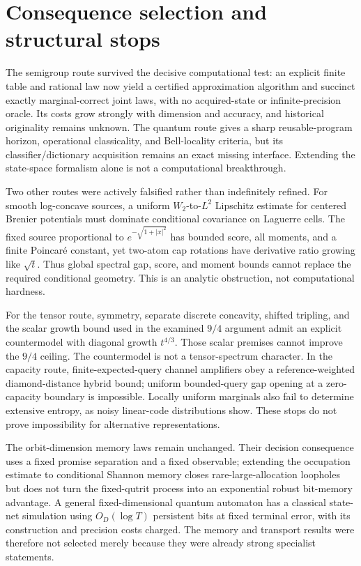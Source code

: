 \documentclass[11pt]{article}
\begin{document}
\section{Consequence selection and structural stops}

The semigroup route survived the decisive computational test: an explicit finite table and rational law now yield a certified approximation algorithm and succinct exactly marginal-correct joint laws, with no acquired-state or infinite-precision oracle. Its costs grow strongly with dimension and accuracy, and historical originality remains unknown. The quantum route gives a sharp reusable-program horizon, operational classicality, and Bell-locality criteria, but its classifier/dictionary acquisition remains an exact missing interface. Extending the state-space formalism alone is not a computational breakthrough.

Two other routes were actively falsified rather than indefinitely refined. For smooth log-concave sources, a uniform $W_2$-to-$L^2$ Lipschitz estimate for centered Brenier potentials must dominate conditional covariance on Laguerre cells. The fixed source proportional to $e^{-\sqrt{1+|x|^2}}$ has bounded score, all moments, and a finite Poincar\'e constant, yet two-atom cap rotations have derivative ratio growing like $\sqrt t$. Thus global spectral gap, score, and moment bounds cannot replace the required conditional geometry. This is an analytic obstruction, not computational hardness.

For the tensor route, symmetry, separate discrete concavity, shifted tripling, and the scalar growth bound used in the examined $9/4$ argument admit an explicit countermodel with diagonal growth $t^{4/3}$. Those scalar premises cannot improve the $9/4$ ceiling. The countermodel is not a tensor-spectrum character. In the capacity route, finite-expected-query channel amplifiers obey a reference-weighted diamond-distance hybrid bound; uniform bounded-query gap opening at a zero-capacity boundary is impossible. Locally uniform marginals also fail to determine extensive entropy, as noisy linear-code distributions show. These stops do not prove impossibility for alternative representations.

The orbit-dimension memory laws remain unchanged. Their decision consequence uses a fixed promise separation and a fixed observable; extending the occupation estimate to conditional Shannon memory closes rare-large-allocation loopholes but does not turn the fixed-qutrit process into an exponential robust bit-memory advantage. A general fixed-dimensional quantum automaton has a classical state-net simulation using $O_D(\log T)$ persistent bits at fixed terminal error, with its construction and precision costs charged. The memory and transport results were therefore not selected merely because they were already strong specialist statements.
\end{document}
